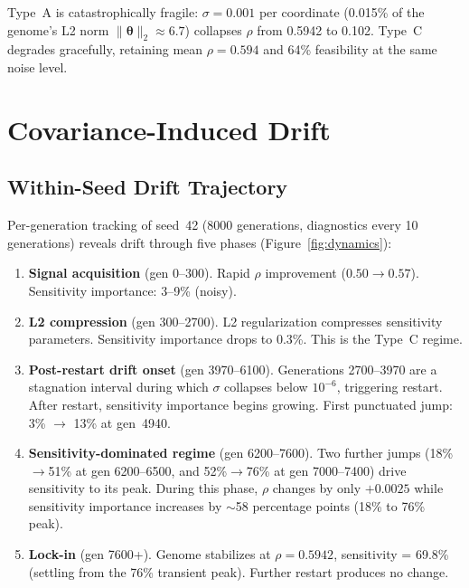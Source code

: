 \documentclass[twoside,11pt]{article}
\newcommand{\btheta}{\boldsymbol{\theta}}
\begin{document}
Type~A is catastrophically fragile: $\sigma = 0.001$ per coordinate (0.015\% of the genome's
L2 norm $\|\btheta\|_2 \approx 6.7$) collapses $\rho$ from 0.5942 to 0.102. Type~C degrades gracefully, retaining
mean $\rho = 0.594$ and 64\% feasibility at the same noise level.

\section{Covariance-Induced Drift}
\label{sec:drift}

\subsection{Within-Seed Drift Trajectory}

Per-generation tracking of seed~42 (8000 generations, diagnostics every 10
generations) reveals drift through five phases (Figure~\ref{fig:dynamics}):

\begin{enumerate}
\item \textbf{Signal acquisition} (gen 0--300). Rapid $\rho$ improvement
  ($0.50 \to 0.57$). Sensitivity importance: 3--9\% (noisy).

\item \textbf{L2 compression} (gen 300--2700). L2 regularization compresses
  sensitivity parameters. Sensitivity importance drops to 0.3\%. This is the
  Type~C regime.

\item \textbf{Post-restart drift onset} (gen 3970--6100). Generations
  2700--3970 are a stagnation interval during which $\sigma$ collapses
  below $10^{-6}$, triggering restart. After restart, sensitivity importance
  begins growing.
  First punctuated jump: 3\% $\to$ 13\% at gen~4940.

\item \textbf{Sensitivity-dominated regime} (gen 6200--7600).
  Two further jumps (18\%$\to$51\% at gen 6200--6500, and 52\%$\to$76\% at gen
  7000--7400) drive sensitivity to its peak. During this phase, $\rho$ changes by
  only $+0.0025$ while sensitivity importance increases by $\sim$58 percentage
  points (18\% to 76\% peak).

\item \textbf{Lock-in} (gen 7600+). Genome stabilizes at $\rho = 0.5942$,
  sensitivity = 69.8\% (settling from the 76\% transient peak). Further restart produces no change.
\end{enumerate}
\end{document}
